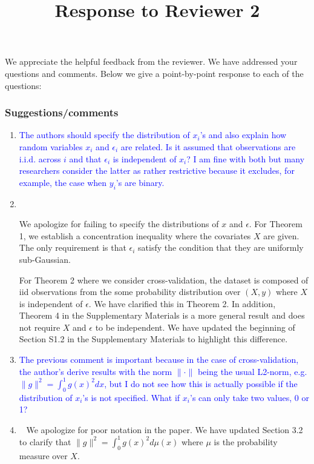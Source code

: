 \documentclass[]{article}
\title{Response to Reviewer 2}
\newcommand{\point}[1]{\item \textcolor{blue}{#1}}
\newcommand{\reply}{\item[]\ }
\begin{document}
	
	\maketitle
	
	We appreciate the helpful feedback from the reviewer. We have addressed your questions and comments. Below we give a point-by-point response to each of the questions:
	
	\subsubsection*{Suggestions/comments}
	
	\begin{enumerate}
		\point{
			The authors should specify the distribution of $x_i$'s and also explain how random variables $x_i$ and $\epsilon_i$ are related. Is it assumed that observations are i.i.d. across $i$ and that $\epsilon_i$ is independent of $x_i$? I am fine with both but many researchers consider the latter as rather restrictive because it excludes, for example, the case when $y_i$’s are binary.
		}
	
		\reply{
			We apologize for failing to specify the distributions of $x$ and $\epsilon$.
			For Theorem 1, we establish a concentration inequality where the covariates $X$ are given.
			The only requirement is that $\epsilon_i$ satisfy the condition that they are uniformly sub-Gaussian.

			For Theorem 2 where we consider cross-validation, the dataset is composed of iid observations from the some probability distribution over $(X,y)$ where $X$ is independent of $\epsilon$.
			We have clarified this in Theorem 2.
			In addition, Theorem 4 in the Supplementary Materials is a more general result and does not require $X$ and $\epsilon$ to be independent.
			We have updated the beginning of Section S1.2 in the Supplementary Materials to highlight this difference.
		}
		
		\point {
			The previous comment is important because in the case of cross-validation, the author's derive results with the norm $\| \cdot \|$ being the usual L2-norm, e.g. $\|g\|^2 = \int_0^1 g(x)^2 dx $, but I do not see how this is actually possible if the distribution of $x_i$’s is not specified. What if $x_i$’s can only take two values, 0 or 1?
		}
	
		\reply{
			We apologize for poor notation in the paper.
			We have updated Section 3.2 to clarify that $\|g\|^2 = \int_0^1 g(x)^2 d\mu(x) $ where $\mu$ is the probability measure over $X$.
		}
		

\end{enumerate}
\end{document}

